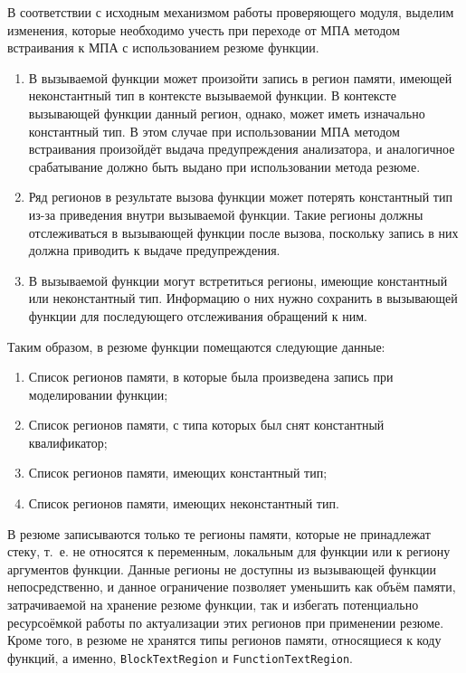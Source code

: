 В соответствии с исходным механизмом работы проверяющего модуля, выделим изменения, которые необходимо учесть при переходе от МПА методом встраивания к МПА с использованием резюме функции.

\begin{enumerate}
 \item В вызываемой функции может произойти запись в регион памяти, имеющей неконстантный тип в контексте вызываемой функции. В контексте вызывающей функции данный регион, однако, может иметь изначально константный тип. В этом случае при использовании МПА методом встраивания произойдёт выдача предупреждения анализатора, и аналогичное срабатывание должно быть выдано при использовании метода резюме.
 \item Ряд регионов в результате вызова функции может потерять константный тип из-за приведения внутри вызываемой функции. Такие регионы должны отслеживаться в вызывающей функции после вызова, поскольку запись в них должна приводить к выдаче предупреждения.
 \item В вызываемой функции могут встретиться регионы, имеющие константный или неконстантный тип. Информацию о них нужно сохранить в вызывающей функции для последующего отслеживания обращений к ним.
\end{enumerate}

Таким образом, в резюме функции помещаются следующие данные:

\begin{enumerate}
 \item Список регионов памяти, в которые была произведена запись при моделировании функции;
 \item Список регионов памяти, с типа которых был снят константный квалификатор;
 \item Список регионов памяти, имеющих константный тип;
 \item Список регионов памяти, имеющих неконстантный тип.
\end{enumerate}

В резюме записываются только те регионы памяти, которые не принадлежат стеку, т.~е. не относятся к переменным, локальным для функции или к региону аргументов функции. Данные регионы не доступны из вызывающей функции непосредственно, и данное ограничение позволяет уменьшить как объём памяти, затрачиваемой на хранение резюме функции, так и избегать потенциально ресурсоёмкой работы по актуализации этих регионов при применении резюме. Кроме того, в резюме не хранятся типы регионов памяти, относящиеся к коду функций, а именно, \texttt{BlockTextRegion} и \texttt{FunctionTextRegion}.

